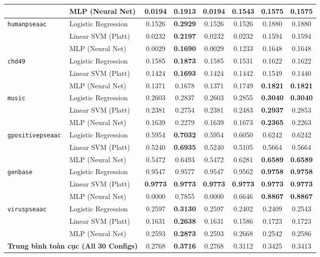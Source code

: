 \documentclass[10pt,a4paper,twoside]{article}
\begin{document}
\begin{table}[H]
{\begin{tabular}{llcccccc}
 & MLP (Neural Net) & 0.0194 & \textbf{0.1913} & 0.0194 & 0.1543 & 0.1575 & 0.1575 \\
\midrule
\multirow{3}{*}{\texttt{humanpseaac}} & Logistic Regression & 0.1526 & \textbf{0.2929} & 0.1526 & 0.1526 & 0.1880 & 0.1880 \\
 & Linear SVM (Platt) & 0.0232 & \textbf{0.2197} & 0.0232 & 0.0232 & 0.1594 & 0.1594 \\
 & MLP (Neural Net) & 0.0029 & \textbf{0.1690} & 0.0029 & 0.1233 & 0.1648 & 0.1648 \\
\midrule
\multirow{3}{*}{\texttt{chd49}} & Logistic Regression & 0.1585 & \textbf{0.1873} & 0.1585 & 0.1531 & 0.1622 & 0.1622 \\
 & Linear SVM (Platt) & 0.1424 & \textbf{0.1693} & 0.1424 & 0.1442 & 0.1549 & 0.1440 \\
 & MLP (Neural Net) & 0.1371 & 0.1678 & 0.1371 & 0.1749 & \textbf{0.1821} & \textbf{0.1821} \\
\midrule
\multirow{3}{*}{\texttt{music}} & Logistic Regression & 0.2603 & 0.2837 & 0.2603 & 0.2855 & \textbf{0.3040} & \textbf{0.3040} \\
 & Linear SVM (Platt) & 0.2381 & 0.2754 & 0.2381 & 0.2483 & \textbf{0.2937} & 0.2853 \\
 & MLP (Neural Net) & 0.1639 & 0.2279 & 0.1639 & 0.1673 & \textbf{0.2365} & 0.2263 \\
\midrule
\multirow{3}{*}{\texttt{gpositivepseaac}} & Logistic Regression & 0.5954 & \textbf{0.7032} & 0.5954 & 0.6050 & 0.6242 & 0.6242 \\
 & Linear SVM (Platt) & 0.5240 & \textbf{0.6935} & 0.5240 & 0.5105 & 0.5664 & 0.5664 \\
 & MLP (Neural Net) & 0.5472 & 0.6493 & 0.5472 & 0.6281 & \textbf{0.6589} & \textbf{0.6589} \\
\midrule
\multirow{3}{*}{\texttt{genbase}} & Logistic Regression & 0.9547 & 0.9577 & 0.9547 & 0.9562 & \textbf{0.9758} & \textbf{0.9758} \\
 & Linear SVM (Platt) & \textbf{0.9773} & \textbf{0.9773} & \textbf{0.9773} & \textbf{0.9773} & \textbf{0.9773} & \textbf{0.9773} \\
 & MLP (Neural Net) & 0.0000 & 0.7855 & 0.0000 & 0.6646 & \textbf{0.8867} & \textbf{0.8867} \\
\midrule
\multirow{3}{*}{\texttt{viruspseaac}} & Logistic Regression & 0.2597 & \textbf{0.3130} & 0.2597 & 0.2402 & 0.2409 & 0.2543 \\
 & Linear SVM (Platt) & 0.1631 & \textbf{0.2638} & 0.1631 & 0.1586 & 0.1723 & 0.1723 \\
 & MLP (Neural Net) & 0.2593 & \textbf{0.2873} & 0.2593 & 0.2668 & 0.2542 & 0.2586 \\
\midrule
\multicolumn{2}{l}{\textbf{Trung bình toàn cục (All 30 Configs)}} & 0.2768 & \textbf{0.3716} & 0.2768 & 0.3112 & 0.3425 & 0.3413 \\
\bottomrule
\end{tabular}%
}
\end{table}
\end{document}
